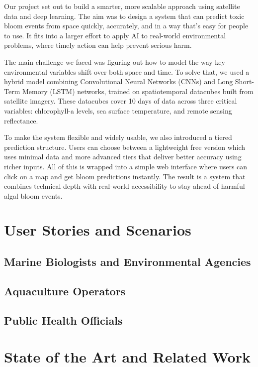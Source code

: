 \documentclass[conference]{IEEEtran}
\begin{document}
Our project set out to build a smarter, more scalable approach using satellite data and deep learning. The aim was to design a system that can predict toxic bloom events from space quickly, accurately, and in a way that's easy for people to use. It fits into a larger effort to apply AI to real-world environmental problems, where timely action can help prevent serious harm.

The main challenge we faced was figuring out how to model the way key environmental variables shift over both space and time. To solve that, we used a hybrid model combining Convolutional Neural Networks (CNNs) and Long Short-Term Memory (LSTM) networks, trained on spatiotemporal datacubes built from satellite imagery. These datacubes cover 10 days of data across three critical variables: chlorophyll-a levels, sea surface temperature, and remote sensing reflectance.

To make the system flexible and widely usable, we also introduced a tiered prediction structure. Users can choose between a lightweight free version which uses minimal data and more advanced tiers that deliver better accuracy using richer inputs. All of this is wrapped into a simple web interface where users can click on a map and get bloom predictions instantly. The result is a system that combines technical depth with real-world accessibility to stay ahead of harmful algal bloom events.\section{User Stories and Scenarios}

\subsection{Marine Biologists and Environmental Agencies}

\subsection{Aquaculture Operators}

\subsection{Public Health Officials}

\section{State of the Art and Related Work}
\end{document}
